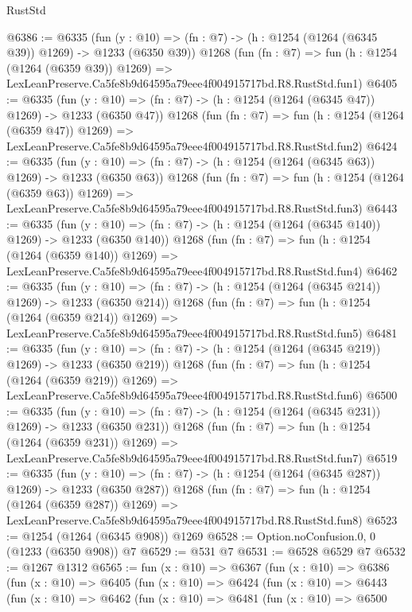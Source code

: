 \begin{lexlean}{RustStd}
\begin{coremodule}
@6386 := @6335
    (fun (y : @10) => (fn : @7) -> (h : @1254 (@1264 (@6345 @39)) @1269) -> @1233 (@6350 @39))
    @1268
    (fun (fn : @7) =>
    fun (h : @1254 (@1264 (@6359 @39)) @1269) =>
    LexLeanPreserve.Ca5fe8b9d64595a79eee4f004915717bd.R8.RustStd.fun1)
@6405 := @6335
    (fun (y : @10) => (fn : @7) -> (h : @1254 (@1264 (@6345 @47)) @1269) -> @1233 (@6350 @47))
    @1268
    (fun (fn : @7) =>
    fun (h : @1254 (@1264 (@6359 @47)) @1269) =>
    LexLeanPreserve.Ca5fe8b9d64595a79eee4f004915717bd.R8.RustStd.fun2)
@6424 := @6335
    (fun (y : @10) => (fn : @7) -> (h : @1254 (@1264 (@6345 @63)) @1269) -> @1233 (@6350 @63))
    @1268
    (fun (fn : @7) =>
    fun (h : @1254 (@1264 (@6359 @63)) @1269) =>
    LexLeanPreserve.Ca5fe8b9d64595a79eee4f004915717bd.R8.RustStd.fun3)
@6443 := @6335
    (fun (y : @10) => (fn : @7) -> (h : @1254 (@1264 (@6345 @140)) @1269) -> @1233 (@6350 @140))
    @1268
    (fun (fn : @7) =>
    fun (h : @1254 (@1264 (@6359 @140)) @1269) =>
    LexLeanPreserve.Ca5fe8b9d64595a79eee4f004915717bd.R8.RustStd.fun4)
@6462 := @6335
    (fun (y : @10) => (fn : @7) -> (h : @1254 (@1264 (@6345 @214)) @1269) -> @1233 (@6350 @214))
    @1268
    (fun (fn : @7) =>
    fun (h : @1254 (@1264 (@6359 @214)) @1269) =>
    LexLeanPreserve.Ca5fe8b9d64595a79eee4f004915717bd.R8.RustStd.fun5)
@6481 := @6335
    (fun (y : @10) => (fn : @7) -> (h : @1254 (@1264 (@6345 @219)) @1269) -> @1233 (@6350 @219))
    @1268
    (fun (fn : @7) =>
    fun (h : @1254 (@1264 (@6359 @219)) @1269) =>
    LexLeanPreserve.Ca5fe8b9d64595a79eee4f004915717bd.R8.RustStd.fun6)
@6500 := @6335
    (fun (y : @10) => (fn : @7) -> (h : @1254 (@1264 (@6345 @231)) @1269) -> @1233 (@6350 @231))
    @1268
    (fun (fn : @7) =>
    fun (h : @1254 (@1264 (@6359 @231)) @1269) =>
    LexLeanPreserve.Ca5fe8b9d64595a79eee4f004915717bd.R8.RustStd.fun7)
@6519 := @6335
    (fun (y : @10) => (fn : @7) -> (h : @1254 (@1264 (@6345 @287)) @1269) -> @1233 (@6350 @287))
    @1268
    (fun (fn : @7) =>
    fun (h : @1254 (@1264 (@6359 @287)) @1269) =>
    LexLeanPreserve.Ca5fe8b9d64595a79eee4f004915717bd.R8.RustStd.fun8)
@6523 := @1254 (@1264 (@6345 @908)) @1269
@6528 := Option.noConfusion.{0, 0} (@1233 (@6350 @908)) @7
@6529 := @531 @7
@6531 := @6528 @6529 @7
@6532 := @1267 @1312
@6565 := fun (x : @10) =>
  @6367
    (fun (x : @10) =>
    @6386
      (fun (x : @10) =>
      @6405
        (fun (x : @10) =>
        @6424
          (fun (x : @10) =>
          @6443
            (fun (x : @10) =>
            @6462
              (fun (x : @10) =>
              @6481
                (fun (x : @10) =>
                @6500

\end{coremodule}
\end{lexlean}
